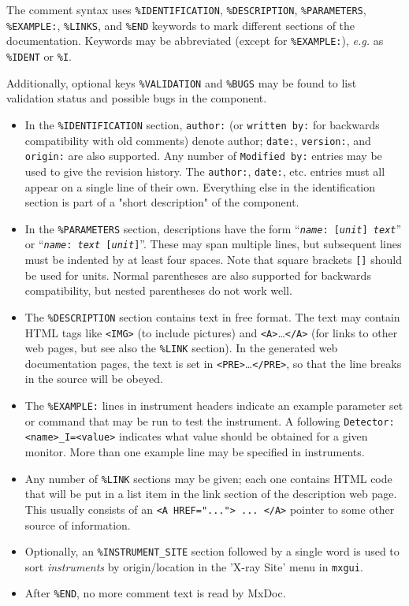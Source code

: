 The comment syntax uses \verb+%IDENTIFICATION+, \verb+%DESCRIPTION+,
\verb+%PARAMETERS+, \verb+%EXAMPLE:+, \verb+%LINKS+, and \verb+%END+
keywords to mark different sections of the documentation. Keywords may
be abbreviated (except for \verb+%EXAMPLE:+), \textit{e.g.} as \verb+%IDENT+ or \verb+%I+.

Additionally, optional keys \verb+%VALIDATION+ and \verb+%BUGS+ may be found to list validation status and possible bugs in the component.

\begin{itemize}
\item In the \verb+%IDENTIFICATION+
  section, \verb+author:+ (or \verb+written by:+ for backwards
  compatibility with old comments) denote author; \verb+date:+,
  \verb+version:+, and \verb+origin:+ are also supported. Any number of
  \verb+Modified by:+ entries may be used to give the revision history.
  The \verb+author:+, \verb+date:+, etc. entries must all
  appear on a single line of their own. Everything else in the
  identification section is part of a "short description" of the
  component.
\item In the \verb+%PARAMETERS+
  section, descriptions have the form
  \hbox{``\texttt{\textit{name\/}:~[\textit{unit\/}] \textit{text\/}}''}
  or \hbox{``\texttt{\textit{name\/}:~\textit{text\/} [\textit{unit\/}]}''}.
  These may span multiple lines, but subsequent lines must be
  indented by at least four spaces. Note that square brackets \verb+[]+ should
  be used for units. Normal parentheses are also supported for backwards
  compatibility, but nested parentheses do not work well.
\item The \verb+%DESCRIPTION+
  section contains text in free format. The text may contain HTML tags
  like \verb+<IMG>+ (to include pictures) and
  \verb+<A>+\ldots\verb+</A>+
  (for links to other web pages, but see also the \verb+%LINK+
  section). In the generated web documentation pages, the text is set in
  \verb+<PRE>+\ldots\verb+</PRE>+, so that the line breaks in the source
  will be obeyed.
\item The \verb+%EXAMPLE:+
  lines in instrument headers indicate an example parameter set or command that may be
  run to test the instrument. A following \verb+Detector: <name>_I=<value>+
  indicates what value should be obtained for a given monitor. More than one example 
  line may be specified in instruments.
\item Any number of \verb+%LINK+
  sections may be given; each one contains HTML code that will be put in
  a list item in the link section of the description web page. This
  usually consists of an \verb+<A HREF="..."> ... </A>+ pointer to some
  other source of information.
\item Optionally, an \verb+%INSTRUMENT_SITE+ section followed by a single word is used to sort \emph{instruments} by origin/location in the 'X-ray Site' menu in \verb+mxgui+.
\item After \verb+%END+, no more comment text is read by MxDoc.
\end{itemize}
